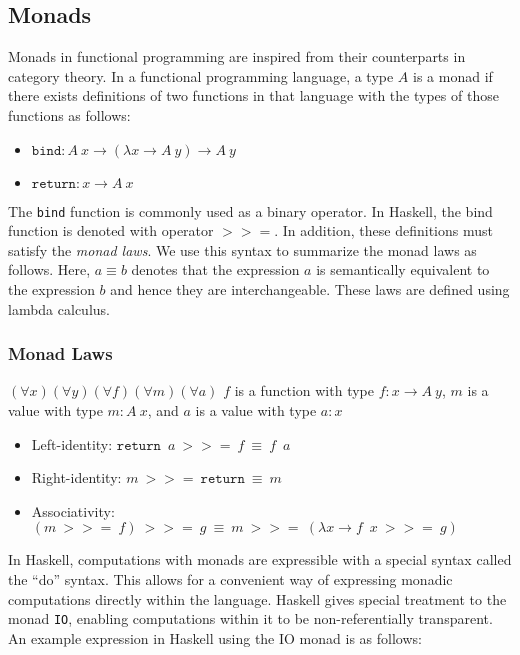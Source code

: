 \documentclass[../main.tex]{subfiles}
\begin{document}
\subsection{Monads}

Monads in functional programming are inspired from their counterparts in category theory.
In a functional programming language, a type $A$ is a monad if there exists definitions of two functions in that language with the types of those functions as follows:

\begin{itemize}
	\item $\mathtt{bind} : A\ x \rightarrow \left(\lambda x \rightarrow A\ y\right) \rightarrow A\ y$
	\item $\mathtt{return} : x \rightarrow A\ x$
\end{itemize}

\newcommand{\hbind}{>\!\!>\!\!=}

The \texttt{bind} function is commonly used as a binary operator.  In Haskell, the bind function is denoted with operator $\hbind$.
In addition, these definitions must satisfy the {\em monad laws}.  We use this syntax to summarize the monad laws as follows.
Here, $a \equiv b$ denotes that the expression $a$ is semantically equivalent to the expression $b$ and hence they are interchangeable.
These laws are defined using lambda calculus.

\subsubsection{Monad Laws}

$(\forall x)(\forall y)(\forall f)(\forall m)(\forall a)$ $f$ is a function with type $f : x \rightarrow A\ y$, $m$ is a value with type $m : A\ x$, and $a$ is a value with type $a : x$

\begin{itemize}
	\item Left-identity: $\mathtt{return}\enspace a\ \hbind\ f\ \equiv\ f\enspace a$
	\item Right-identity: $m\ \hbind\ \mathtt{return}\ \equiv\ m$
	\item Associativity: $(m\ \hbind\ f)\ \hbind\ g\ \equiv\ m\ \hbind\ (\lambda x \rightarrow f\enspace x\ \hbind\ g)$
\end{itemize}

In Haskell, computations with monads are expressible with a special syntax called the ``do'' syntax.
This allows for a convenient way of expressing monadic computations directly within the language.
Haskell gives special treatment to the monad \texttt{IO}, enabling computations within it
to be non-referentially transparent.  An example expression in Haskell using the IO monad is as follows:
\end{document}
